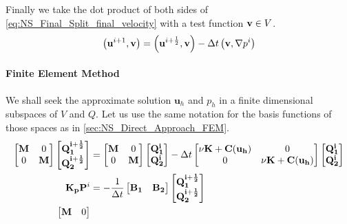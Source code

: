 Finally we take the dot product of both sides of \cref{eq:NS_Final_Split_final_velocity} with a test function $\mathbf{v} \in V$.
$$
\left(\mathbf{u}^{i+1}, \mathbf{v}\right) = \left(\mathbf{u}^{i+\frac{1}{2}}, \mathbf{v}\right) - \Delta t\left(\mathbf{v}, \nabla p^i\right)
$$
\paragraph{Finite Element Method}
We shall seek the approximate solution $\mathbf{u}_h$ and $p_h$ in a finite dimensional subspaces of $V$ and $Q$. Let us use the same notation for the basis functions of those spaces as in \cref{sec:NS_Direct_Approach_FEM}.
\begin{equation}
\begin{aligned}
	\begin{bmatrix}
		\mathbf{M} & 0 \\
		0 & \mathbf{M}
	\end{bmatrix}
	\begin{bmatrix}
		\mathbf{Q^{i + \frac{1}{2}}_1} \\
		\mathbf{Q^{i + \frac{1}{2}}_2}
	\end{bmatrix} &=
	\begin{bmatrix}
		\mathbf{M} & 0 \\
		0 & \mathbf{M}
	\end{bmatrix}
	\begin{bmatrix}
		\mathbf{Q^{i}_1} \\
		\mathbf{Q^{i}_2}
	\end{bmatrix} - \Delta t \begin{bmatrix}
		\nu \mathbf{K} + \mathbf{C}(\mathbf{u_h}) & 0 \\
		0 & \nu \mathbf{K} + \mathbf{C}(\mathbf{u_h})
	\end{bmatrix} \begin{bmatrix}
		\mathbf{Q^i_1} \\
		\mathbf{Q^i_2}
	\end{bmatrix} \\
	\mathbf{K_p}\mathbf{P}^i &= -\frac{1}{\Delta t} \begin{bmatrix}
		\mathbf{B_1} & \mathbf{B_2}
	\end{bmatrix} \begin{bmatrix}
		\mathbf{Q^{i + \frac{1}{2}}_1} \\
		\mathbf{Q^{i + \frac{1}{2}}_2}
	\end{bmatrix} \\
	\begin{bmatrix}
		\mathbf{M} & 0 \\

\end{bmatrix}
\end{aligned}
\end{equation}
